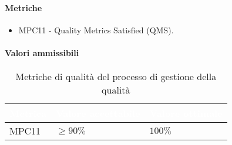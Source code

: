 \paragraph{Metriche}
\begin{itemize}
	\item MPC11 - Quality Metrics Satisfied (QMS).
\end{itemize}

\paragraph{Valori ammissibili}
{
\renewcommand{\arraystretch}{1.5}
\centering
\begin{longtable}{C{2.5cm} C{4cm} C{4cm}}
\textcolor{white}{\textbf{Metrica}}&
\textcolor{white}{\textbf{Valore accettabile}}&
\textcolor{white}{\textbf{Valore ottimale}}\\	
\endhead
\endfoot
{}\caption{Metriche di qualità del processo di gestione della qualità}
\endlastfoot

MPC11 & $\geq 90\% $  & $ 100 \% $ \\

\end{longtable}
}

